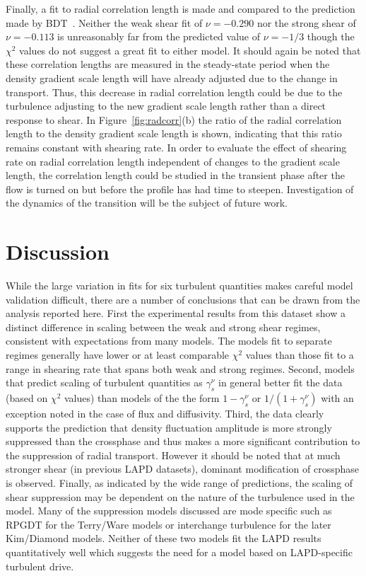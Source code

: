 \documentclass[aip,pop,amsmath,amssymb,peprint,superscriptaddress]{revtex4-1} %
\begin{document}
Finally, a fit to radial correlation length is made and compared to the prediction made by BDT~\cite{biglari90}. Neither the weak shear fit of $\nu = -0.290$ nor the strong shear of $\nu = -0.113$ is unreasonably far from the predicted value of $\nu = -1/3$ though the $\chi^{2}$ values do not suggest a great fit to either model. It should again be noted that these correlation lengths are measured in the steady-state period when the density gradient scale length will have already adjusted due to the change in transport. Thus, this decrease in radial correlation length could be due to the turbulence adjusting to the new gradient scale length rather than a direct response to shear.  In Figure~\ref{fig:radcorr}(b) the ratio of the radial correlation length to the density gradient scale length is shown, indicating that this ratio remains constant with shearing rate. In order to evaluate the effect of shearing rate on radial correlation length independent of changes to the gradient scale length, the correlation length could be studied in the transient phase after the flow is turned on but before the profile has had time to steepen. Investigation of the dynamics of the transition will be the subject of future work. 

\section{Discussion}

While the large variation in fits for six turbulent quantities makes
careful model validation difficult, there are a number of conclusions
that can be drawn from the analysis reported here. First the
experimental results from this dataset show a distinct difference in
scaling between the weak and strong shear regimes, consistent with
expectations from many models. The models fit to separate regimes generally have lower or at least comparable $\chi^{2}$ values than those fit to a range in shearing rate that spans both weak and strong regimes. Second, models that predict scaling of
turbulent quantities as $\gamma_{s}^{\nu}$ in general better fit the
data (based on $\chi^{2}$ values) than models of the the form
$1-\gamma_{s}^{\nu}$ or $1/(1+\gamma_{s}^{\nu})$ with an exception noted in the case of flux and
diffusivity. Third, the data clearly supports the prediction that
density fluctuation amplitude is more strongly suppressed than the
crossphase and thus makes a more significant contribution to the
suppression of radial transport.  However it should be noted that at
much stronger shear (in previous LAPD datasets), dominant
modification of crossphase is observed.  Finally, as indicated by the
wide range of predictions, the scaling of shear suppression may be
dependent on the nature of the turbulence used in the model. Many of
the suppression models discussed are mode specific such as
RPGDT for the Terry/Ware models or interchange turbulence
for the later Kim/Diamond models. Neither of these two models fit the
LAPD results quantitatively well which suggests the need for a
model based on LAPD-specific turbulent drive.  
\end{document}
